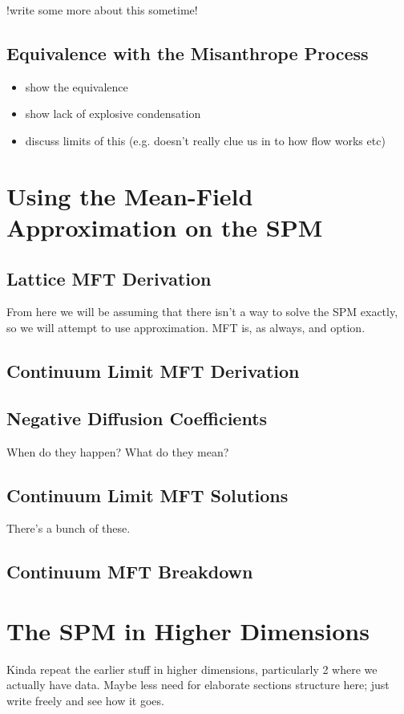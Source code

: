 !write some more about this sometime!

\subsection{Equivalence with the Misanthrope Process}
\begin{itemize}
 \item show the equivalence
 \item show lack of explosive condensation
 \item discuss limits of this (e.g. doesn't really clue us in to how flow works etc)
\end{itemize}

\section{Using the Mean-Field Approximation on the SPM}
\subsection{Lattice MFT Derivation}

From here we will be assuming that there isn't a way to solve the SPM exactly, so we will attempt to use approximation. MFT is, as always, and option.
\subsection{Continuum Limit MFT Derivation}
\subsection{Negative Diffusion Coefficients}
When do they happen? What do they mean?
\subsection{Continuum Limit MFT Solutions}
There's a bunch of these.
\subsection{Continuum MFT Breakdown}

\section{The SPM in Higher Dimensions}
Kinda repeat the earlier stuff in higher dimensions, particularly 2 where we actually have data. Maybe less need for elaborate sections structure here; just write freely and see how it goes.

